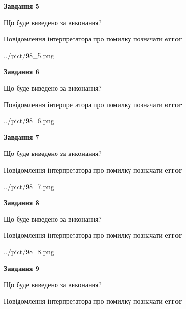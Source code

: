 \documentclass[11pt, ukrainian]{article}
\begin{document}
{\begin {large}
{\begin {center}\textbf{Завдання 5}\end {center}}\par
Що буде виведено за виконання? \par
Повідомлення інтерпретатора про помилку позначати \textbf{error}

\begin{center}
	{../pict/98_5.png}
\end{center}
\newpage

{\begin {center}\textbf{Завдання 6}\end {center}}\par
Що буде виведено за виконання? \par
Повідомлення інтерпретатора про помилку позначати \textbf{error}

\begin{center}
	{../pict/98_6.png}
\end{center}
\newpage

{\begin {center}\textbf{Завдання 7}\end {center}}\par
Що буде виведено за виконання? \par
Повідомлення інтерпретатора про помилку позначати \textbf{error}

\begin{center}
	{../pict/98_7.png}
\end{center}
\newpage

{\begin {center}\textbf{Завдання 8}\end {center}}\par
Що буде виведено за виконання? \par
Повідомлення інтерпретатора про помилку позначати \textbf{error}

\begin{center}
	{../pict/98_8.png}
\end{center}
\newpage

{\begin {center}\textbf{Завдання 9}\end {center}}\par
Що буде виведено за виконання? \par
Повідомлення інтерпретатора про помилку позначати \textbf{error}


\end{large}}
\end{document}
